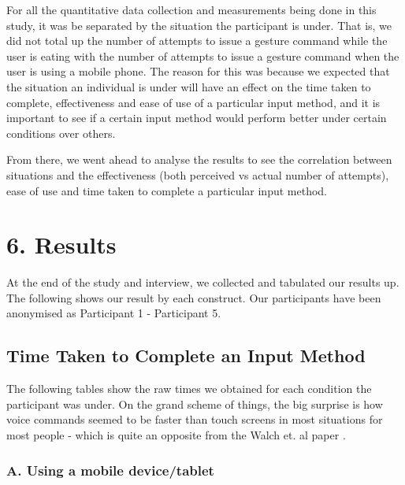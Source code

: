\documentclass{sigchi}
\begin{document}
For all the quantitative data collection and measurements being done in this study, it was be separated by the situation the participant is under. That is, we did not total up the number of attempts to issue a gesture command while the user is eating with the number of attempts to issue a gesture command when the user is using a mobile phone. The reason for this was because we expected that the situation an individual is under will have an effect on the time taken to complete, effectiveness and ease of use of a particular input method, and it is important to see if a certain input method would perform better under certain conditions over others.

From there, we went ahead to analyse the results to see the correlation between situations and the effectiveness (both perceived vs actual number of attempts), ease of use and time taken to complete a particular input method.

\section {6. Results}

At the end of the study and interview, we collected and tabulated our results up. The following shows our result by each construct. Our participants have been anonymised as Participant 1 - Participant 5.
\subsection{Time Taken to Complete an Input Method}
The following tables show the raw times we obtained for each condition the participant was under. On the grand scheme of things, the big surprise is how voice commands seemed to be faster than touch screens in most situations for most people - which is quite an opposite from the Walch et. al paper \cite{Walch2016}.

\pagebreak
\subsubsection{A. Using a mobile device/tablet}
\end{document}
